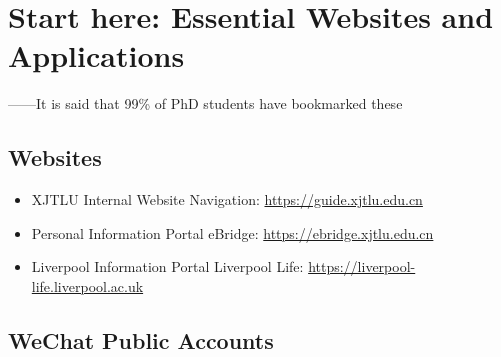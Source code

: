 \chapter{Start here: Essential Websites and Applications}
\label{necessary_resources}

\begin{flushright}
    ——It is said that 99\% of PhD students have bookmarked these
\end{flushright}    

\section{Websites}
\begin{itemize}
    \item XJTLU Internal Website Navigation: \url{https://guide.xjtlu.edu.cn}
    \item Personal Information Portal eBridge: \url{https://ebridge.xjtlu.edu.cn}
    \item Liverpool Information Portal Liverpool Life: \url{https://liverpool-life.liverpool.ac.uk}
\end{itemize}

\section{WeChat Public Accounts}

